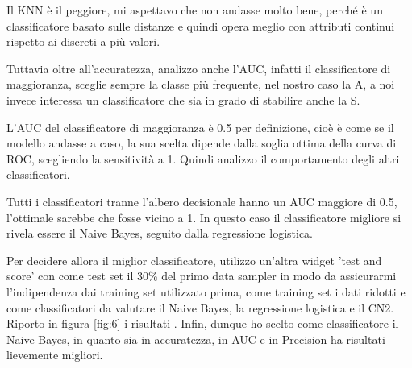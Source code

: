 \documentclass[a4paper, 12p]{report}
\begin{document}
 Il KNN è il peggiore, mi aspettavo che non andasse molto bene, perché è un classificatore basato sulle distanze e quindi opera meglio con attributi continui rispetto ai discreti a più valori.

Tuttavia oltre all'accuratezza, analizzo anche l'AUC, infatti il classificatore di maggioranza, sceglie sempre la classe più frequente, nel nostro caso la A, a noi invece interessa un classificatore che sia in grado di stabilire anche la S. 

L'AUC del classificatore di maggioranza è 0.5 per definizione, cioè è come se il modello andasse a caso, la sua scelta dipende dalla soglia ottima della curva di ROC, scegliendo la sensitività a 1. Quindi analizzo il comportamento degli altri classificatori.

Tutti i classificatori tranne l'albero decisionale hanno un AUC maggiore di 0.5, l'ottimale sarebbe che fosse vicino a 1. In questo caso il classificatore migliore si rivela essere il Naive Bayes, seguito dalla regressione logistica.

Per decidere allora il miglior classificatore, utilizzo un'altra widget 'test and score' con come test set il 30\% del primo data sampler in modo da assicurarmi l'indipendenza dai training set utilizzato prima, come training set i dati ridotti e come classificatori da valutare il Naive Bayes, la regressione logistica e il CN2.
Riporto in figura \ref{fig:6} i risultati . 
Infin, dunque ho scelto come classificatore il Naive Bayes, in quanto sia in accuratezza, in AUC e in Precision ha risultati lievemente migliori.
\end{document}
